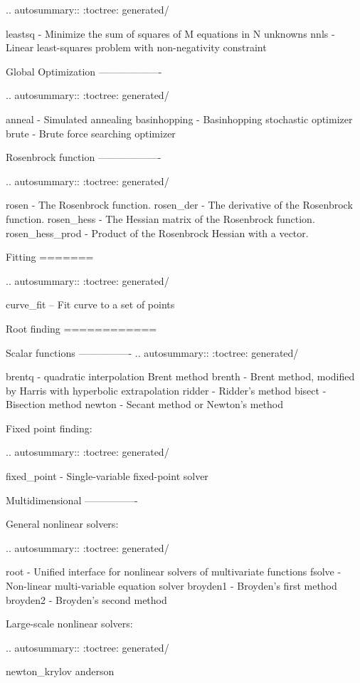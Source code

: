 \begin{DoxyVerb}
.. autosummary::
   :toctree: generated/

   leastsq - Minimize the sum of squares of M equations in N unknowns
   nnls - Linear least-squares problem with non-negativity constraint

Global Optimization
-------------------

.. autosummary::
   :toctree: generated/

   anneal - Simulated annealing
   basinhopping - Basinhopping stochastic optimizer
   brute - Brute force searching optimizer

Rosenbrock function
-------------------

.. autosummary::
   :toctree: generated/

   rosen - The Rosenbrock function.
   rosen_der - The derivative of the Rosenbrock function.
   rosen_hess - The Hessian matrix of the Rosenbrock function.
   rosen_hess_prod - Product of the Rosenbrock Hessian with a vector.

Fitting
=======

.. autosummary::
   :toctree: generated/

   curve_fit -- Fit curve to a set of points

Root finding
============

Scalar functions
----------------
.. autosummary::
   :toctree: generated/

   brentq - quadratic interpolation Brent method
   brenth - Brent method, modified by Harris with hyperbolic extrapolation
   ridder - Ridder's method
   bisect - Bisection method
   newton - Secant method or Newton's method

Fixed point finding:

.. autosummary::
   :toctree: generated/

   fixed_point - Single-variable fixed-point solver

Multidimensional
----------------

General nonlinear solvers:

.. autosummary::
   :toctree: generated/

   root - Unified interface for nonlinear solvers of multivariate functions
   fsolve - Non-linear multi-variable equation solver
   broyden1 - Broyden's first method
   broyden2 - Broyden's second method

Large-scale nonlinear solvers:

.. autosummary::
   :toctree: generated/

   newton_krylov
   anderson


\end{DoxyVerb}
